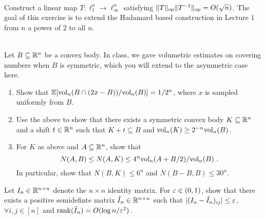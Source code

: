 

\newif\ifsolutions\solutionsfalse



\ifsolutions
\homeworksol{1}
\else
{}
\fi

\begin{exercise}~\\
Construct a linear map $T: \ell_1^n \rightarrow \ell_\infty^n$ satisfying
$\|T\|_{\rm op}\|T^{-1}\|_{\rm op} = O(\sqrt{n})$. The goal of this exercise is
to extend the Hadamard based construction in Lecture $1$ from $n$ a power of $2$
to all $n$.  
\end{exercise}

\begin{exercise}

\end{exercise}

\begin{exercise}~\\
Let $B \subseteq \mathbb{R}^n$ be a convex body. In class, we gave volumetric estimates
on covering numbers when $B$ is symmetric, which you will extend to the
asymmetric case here.

\begin{enumerate}
\item Show that $\mathbb{E}[{\rm vol}_n(B \cap (2x-B))/{\rm vol}_n(B)] = 1/2^n$, where $x$ is
sampled uniformly from $B$. \\
\item Use the above to show that there exists a symmetric convex body $K
\subseteq \mathbb{R}^n$ and a shift $t \in \mathbb{R}^n$ such that $K+t \subseteq B$ and
${\rm vol}_n(K) \geq 2^{-n} {\rm vol}_n(B)$. \\
\item For $K$ as above and $A \subseteq \mathbb{R}^n$, show that
\[
N(A,B) \leq N(A,K) \leq 4^n {\rm vol}_n(A+B/2)/{\rm vol}_n(B) \text{ .}
\]  
In particular, show that $N(B,K) \leq 6^n$ and $N(B-B,B) \leq 30^n$. \\ 
\end{enumerate}
\end{exercise}

\begin{exercise}
Let $I_n \in \mathbb{R}^{n \times n}$ denote the $n \times n$ identity matrix. For $\varepsilon
\in (0,1)$, show that there exists a positive semidefinte matrix $\tilde{I}_n
\in \mathbb{R}^{n \times n}$ such that $|(I_n-\tilde{I}_n)_{ij}| \leq \varepsilon$, $\forall
i,j \in [n]$ and ${\rm rank}(\tilde{I}_n) = O(\log n / \varepsilon^2)$. \\
\end{exercise}


